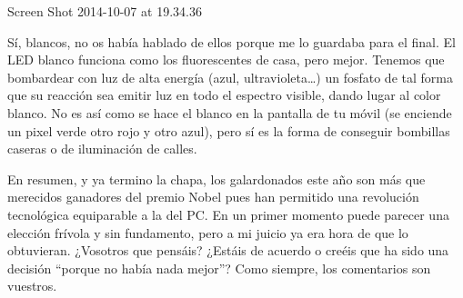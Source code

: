 Screen Shot 2014-10-07 at 19.34.36

Sí, blancos, no os había hablado de ellos porque me lo guardaba para el final. El LED blanco funciona como los fluorescentes de casa, pero mejor. Tenemos que bombardear con luz de alta energía (azul, ultravioleta…) un fosfato de tal forma que su reacción sea emitir luz en todo el espectro visible, dando lugar al color blanco. No es así como se hace el blanco en la pantalla de tu móvil (se enciende un pixel verde otro rojo y otro azul), pero sí es la forma de conseguir bombillas caseras o de iluminación de calles.

En resumen, y ya termino la chapa, los galardonados este año son más que merecidos ganadores del premio Nobel pues han permitido una revolución tecnológica equiparable a la del PC. En un primer momento puede parecer una elección frívola y sin fundamento, pero a mi juicio ya era hora de que lo obtuvieran. ¿Vosotros que pensáis? ¿Estáis de acuerdo o creéis que ha sido una decisión “porque no había nada mejor”? Como siempre, los comentarios son vuestros.




